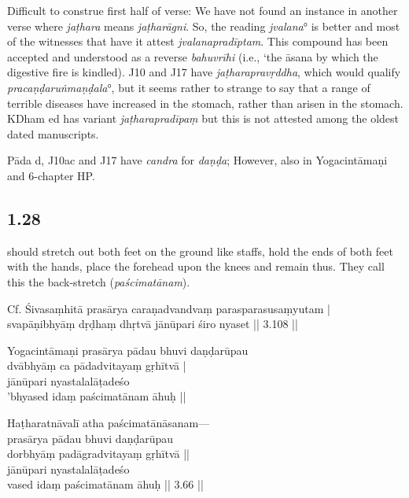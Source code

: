 \begin{ekdosis}
\begin{philcomm}[hp01_027]
Difficult to construe first half of verse:
We have not found an instance in another verse where \emph{jaṭhara} means \emph{jaṭharāgni}. So, the reading \emph{jvalana}° is better and most of the witnesses that have it attest \emph{jvalanapradīptam}. This compound has been accepted and understood as a reverse \emph{bahuvrīhi} (i.e., ‘the āsana by which the digestive fire is kindled). J10 and J17 have \emph{jaṭharapravṛddha}, which would qualify \emph{pracaṇḍaruṅmaṇḍala}°, but it seems rather to strange to say that a range of terrible diseases have increased in the stomach, rather than arisen in the stomach. KDham ed has variant \emph{jaṭharapradīpaṃ} but this is not attested among the oldest dated manuscripts.

Pāda d, J10ac and J17 have \emph{candra} for \emph{daṇḍa}; However,  also in Yogacintāmaṇi and 6-chapter HP.
\end{philcomm}

\subsection*{1.28}
\begin{translation} should stretch out both feet on the ground like staffs, hold the ends of both feet with the hands, place the forehead upon the knees and remain thus. They call this the back-stretch (\emph{paścimatānam}).
\end{translation}

\begin{sources}[hp01_028]
Cf. Śivasaṃhitā
\startverse
prasārya caraṇadvandvaṃ parasparasusaṃyutam |\\
svapāṇibhyāṃ dṛḍhaṃ dhṛtvā jānūpari śiro nyaset || 3.108 ||
\endverse
\end{sources}

\begin{testimonia}[hp01_028]
Yogacintāmaṇi
\startverse
prasārya pādau bhuvi daṇḍarūpau \\
dvābhyāṃ ca pādadvitayaṃ gṛhītvā |\\
jānūpari nyastalalāṭadeśo \\
'bhyased idaṃ paścimatānam āhuḥ ||
\endverse

Haṭharatnāvalī
\startverse
atha paścimatānāsanam---\\
prasārya pādau bhuvi daṇḍarūpau \\
dorbhyāṃ padāgradvitayaṃ gṛhītvā ||\\
jānūpari nyastalalāṭadeśo \\
vased idaṃ paścimatānam āhuḥ || 3.66 ||
\endverse
\end{testimonia}


\end{ekdosis}
